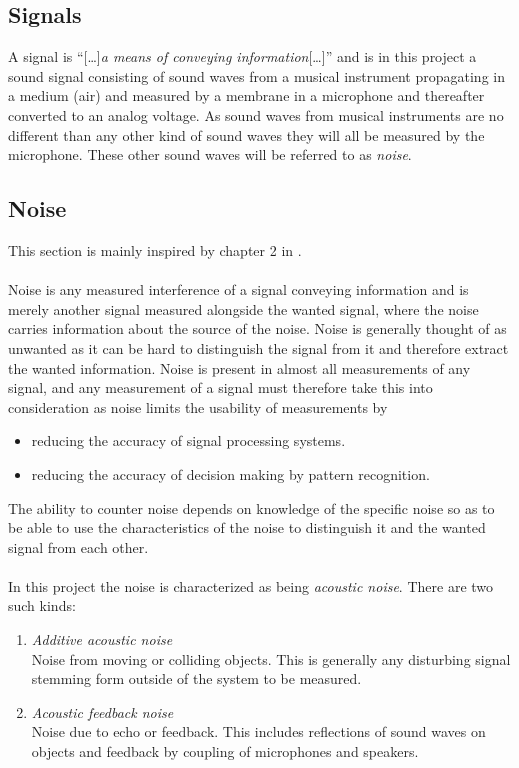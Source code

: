 \subsection{Signals}
A signal is ``[\dots]\textit{a means of conveying information}[\dots]'' \cite{signal_noise} and is in this project a sound signal consisting of sound waves from a musical instrument propagating in a medium (air) and measured by a membrane in a microphone and thereafter converted to an analog voltage. As sound waves from musical instruments are no different than any other kind of sound waves they will all be measured by the microphone. These other sound waves will be referred to as \textit{noise}.

\subsection{Noise}
This section is mainly inspired by chapter 2 in \cite{signal_noise}. \\ \\
Noise is any measured interference of a signal conveying information and is merely another signal measured alongside the wanted signal, where the noise carries information about the source of the noise.  Noise is generally thought of as unwanted as it can be hard to distinguish the signal from it and therefore extract the wanted information. Noise is present in almost all measurements of any signal, and any measurement of a signal must therefore take this into consideration as noise limits the usability of measurements by
\begin{itemize}
\item reducing the accuracy of signal processing systems.
\item reducing the accuracy of decision making by pattern recognition.
\end{itemize}
The ability to counter noise depends on knowledge of the specific noise so as to be able to use the characteristics of the noise to distinguish it and the wanted signal from each other.
\\ \\
In this project the noise is characterized as being \textit{acoustic noise}. There are two such kinds:
\begin{enumerate}
\item \textit{Additive acoustic noise} \\
Noise from moving or colliding objects. This is generally any disturbing signal stemming form outside of the system to be measured.
\item \textit{Acoustic feedback noise} \\
Noise due to echo or feedback. This includes reflections of sound waves on objects and feedback by coupling of microphones and speakers.
\end{enumerate}

